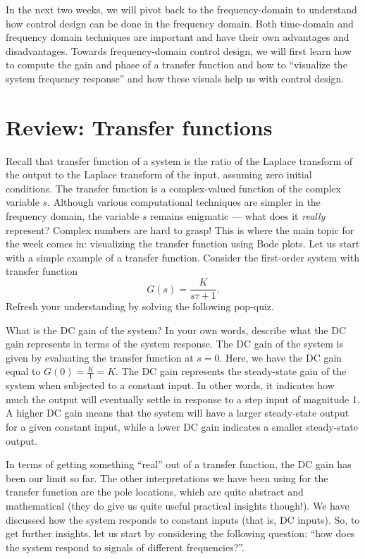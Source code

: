 \documentclass{ee122_notes}
\begin{document}
In the next two weeks, we will pivot back to the frequency-domain to understand how control design can be done in the frequency domain. Both time-domain and frequency domain techniques are important and have their own advantages and disadvantages. Towards frequency-domain control design, we will first learn how to compute the gain and phase of a transfer function and how to ``visualize the system frequency response'' and how these visuals help us with control design.
\section{Review: Transfer functions}
Recall that transfer function of a system is the ratio of the Laplace transform of the output to the Laplace transform of the input, assuming zero initial conditions. The transfer function is a complex-valued function of the complex variable \(s\). Although various computational techniques are simpler in the frequency domain, the variable $s$ remains enigmatic --- what does it \textit{really} represent? Complex numbers are hard to grasp! This is where the main topic for the week comes in: visualizing the transfer function using Bode plots. Let us start with a simple example of a transfer function. Consider the first-order system with transfer function
\[
G(s) = \frac{K}{s\tau + 1}.
\]
Refresh your understanding by solving the following pop-quiz.
\begin{popquiz}
What is the DC gain of the system? In your own words, describe what the DC gain represents in terms of the system response.
\popqsplit 
The DC gain of the system is given by evaluating the transfer function at \(s=0\). Here, we have the DC gain equal to \(G(0) = \frac{K}{1} = K\). The DC gain represents the steady-state gain of the system when subjected to a constant input. In other words, it indicates how much the output will eventually settle in response to a step input of magnitude 1. A higher DC gain means that the system will have a larger steady-state output for a given constant input, while a lower DC gain indicates a smaller steady-state output.
\end{popquiz}
In terms of getting something ``real'' out of a transfer function, the DC gain has been our limit so far. The other interpretations we have been using for the transfer function are the pole locations, which are quite abstract and mathematical (they do give us quite useful practical insights though!). We have discussed how the system responds to constant inputs (that is, DC inputs). So, to get further insights, let us start by considering the following question: ``how does the system respond to signals of different frequencies?''. 
\end{document}
